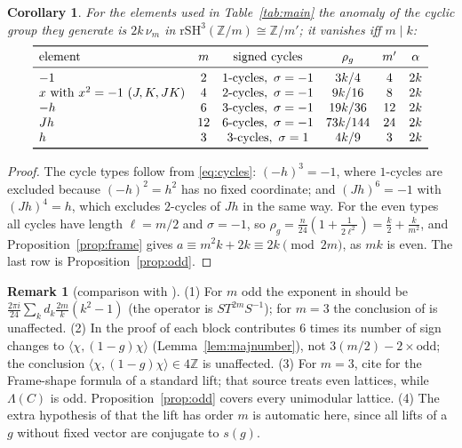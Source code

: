 \documentclass[11pt]{amsart}
\newtheorem{corollary}[theorem]{Corollary}
\theoremstyle{definition}
\newtheorem{remark}[theorem]{Remark}
\newcommand{\Z}{\mathbb{Z}}
\newcommand{\rSH}{\mathrm{rSH}^3}
\begin{document}
\begin{corollary}\label{cor:cyclic}
For the elements used in Table~\ref{tab:main} the anomaly of the cyclic group they generate is $2k\,\nu_m$
in $\rSH(\Z/m)\cong\Z/m'$; it vanishes iff $m\mid k$:
\[
\begin{array}{lccccc}
\toprule
\text{element} & m & \text{signed cycles} & \rho_g & m' & \alpha\\
\midrule
-1 & 2 & 1\text{-cycles},\ \sigma=-1 & 3k/4 & 4 & 2k\\
x\text{ with }x^2=-1\ (J,K,JK) & 4 & 2\text{-cycles},\ \sigma=-1 & 9k/16 & 8 & 2k\\
-h & 6 & 3\text{-cycles},\ \sigma=-1 & 19k/36 & 12 & 2k\\
Jh & 12 & 6\text{-cycles},\ \sigma=-1 & 73k/144 & 24 & 2k\\
h & 3 & 3\text{-cycles},\ \sigma=1 & 4k/9 & 3 & 2k\\
\bottomrule
\end{array}
\]
\end{corollary}

\begin{proof}
The cycle types follow from \eqref{eq:cycles}: $(-h)^3=-1$, where $1$-cycles are excluded because
$(-h)^2=h^2$ has no fixed coordinate; and $(Jh)^6=-1$ with $(Jh)^4=h$, which excludes $2$-cycles of
$Jh$ in the same way. For the even types all cycles have length
$\ell=m/2$ and $\sigma=-1$, so $\rho_g=\frac n{24}(1+\frac1{2\ell^2})=\frac k2+\frac k{m^2}$, and
Proposition~\ref{prop:frame} gives $a\equiv m^2k+2k\equiv2k\pmod{2m}$, as $mk$ is even. The last row is
Proposition~\ref{prop:odd}.
\end{proof}

\begin{remark}[comparison with \cite{GJF}]\label{rem:GJFtypos}
(1) For $m$ odd the exponent in \cite[Ex.~4.4]{GJF} should be $\frac{2\pi i}{24}\sum_kd_k\frac{2m}k(k^2-1)$
(the operator is $ST^{2m}S^{-1}$); for $m=3$ the conclusion of \cite{GJF} is unaffected. (2) In the proof
of \cite[Thm.~5.6]{GJF} each block contributes $6$ times its number of sign changes to
$\langle\chi,(1-g)\chi\rangle$ (Lemma~\ref{lem:majnumber}), not $3(m/2)-2\times\mathrm{odd}$; the
conclusion $\langle\chi,(1-g)\chi\rangle\in4\Z$ is unaffected. (3) For $m=3$, \cite{GJF} cite
\cite[Ch.~5]{Moller} for the Frame-shape formula of a standard lift; that source treats even lattices,
while $\Lambda(C)$ is odd. Proposition~\ref{prop:odd} covers every unimodular lattice. (4) The extra
hypothesis of \cite[Ex.~4.4]{GJF} that the lift has order $m$ is automatic here, since all lifts of a
$g$ without fixed vector are conjugate to $s(g)$.
\end{remark}
\end{document}
